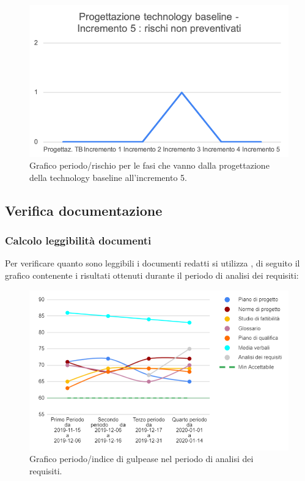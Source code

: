 	\begin{figure}[H]
			\centering
			\includegraphics[width=0.8\linewidth]{./res/images/RischiNonPrevent_3.png}
			\caption{Grafico periodo/rischio per le fasi che vanno dalla progettazione della technology baseline all'incremento 5.}
			\label{fig:Grafico periodo/rischio per le fasi che vanno dalla progettazione della technology baseline all'incremento 5.}
	\end{figure}
	

\subsection{Verifica documentazione}

\subsubsection{Calcolo leggibilità documenti}
Per verificare quanto sono leggibili i documenti redatti si utilizza , di seguito il grafico contenente i risultati ottenuti durante il periodo di analisi dei requisiti:

\begin{figure}[H]
	\centering
	\includegraphics[width=0.8\linewidth]{./res/images/gulpease.png}
	\caption{Grafico periodo/indice di gulpease nel periodo di analisi dei requisiti.}
	\label{fig:Grafico indice di gulpease periodo di analisi dei requisiti.}
\end{figure}

